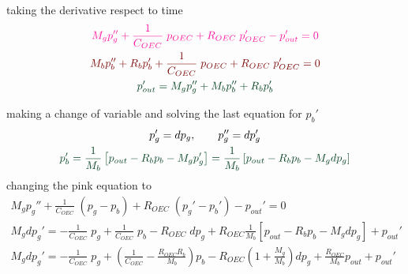 \begin{itemize}
    taking the derivative respect to time
    \begin{equation}\label{OEC_loops_derivatives}
        \begin{gathered}
            \color{mypink} M_g p_g''+ \frac{1}{C_{OEC}}\; p_{OEC} +R_{OEC} \; p_{OEC}'- p_{out}'  = 0\\ %
        \color{myred} M_b p_b''+R_b p_b'+\frac{1}{C_{OEC}} \; p_{OEC} + R_{OEC} \; p_{OEC}'=0\\
        \color{mygreen}p_{out}' = M_g p_g''+M_bp_b''+R_bp_b'
        \end{gathered}
    \end{equation}
    
    
    
    making a change of variable and solving the last equation for $p_b'$ 
    \begin{gather}\label{derivate_b_dpg}
        p_{g}' = dp_{g} , \qquad p_{g}'' =  dp_{g}' \\ \label{derivate_b}
        \color{mygreen} 
        p_b'= \frac{1}{M_b}\left[ p_{out}-R_bp_b-M_{g}p_{g}'\right] = \frac{1}{M_b}\left[ p_{out}-R_bp_b-M_{g}dp_{g}\right]
    \end{gather}
    changing the pink equation to 
    \begin{gather*}
         M_g p_g''+ \frac{1}{C_{OEC}}\; (p_g-p_b) +R_{OEC} \; (p_g'-p_b')- p_{out}'  = 0\\
         M_g dp_g'= -\frac{1}{C_{OEC}}\; p_g+\frac{1}{C_{OEC}}\;p_b -R_{OEC} \; dp_g+ R_{OEC} \frac{1}{M_b}\left[ p_{out}-R_bp_b-M_{g}dp_{g}\right] + p_{out}'\\
         M_g dp_g'= -\frac{1}{C_{OEC}}\; p_g+\left(\frac{1}{C_{OEC}} -\frac{R_{OEC}R_b}{M_b}\right)p_b -R_{OEC}\left(1+\frac{M_g}{M_b}\right) dp_g+  \frac{R_{OEC}}{M_b} p_{out} + p_{out}'
    \end{gather*}
    

\end{itemize}
